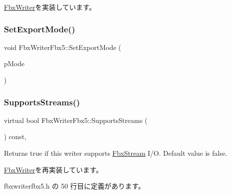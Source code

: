\hyperlink{class_fbx_writer_a0fd62ec785e7108924975591ee8fbf30}{Fbx\+Writer}を実装しています。

\mbox{\label{class_fbx_writer_fbx5_acc9f4ffbe4f27954c534a53b4a0ccb32}} 
\subsubsection{\texorpdfstring{Set\+Export\+Mode()}{SetExportMode()}}
{\footnotesize\ttfamily void Fbx\+Writer\+Fbx5\+::\+Set\+Export\+Mode (\begin{DoxyParamCaption}\item[{\hyperlink{class_fbx_writer_fbx5_a0424a2f24c66021ce1bfe4477eb4209e}{E\+Export\+Mode}}]{p\+Mode }\end{DoxyParamCaption})}

\mbox{\label{class_fbx_writer_fbx5_a6e6683ad630d545bd0251f7bf8e114d9}} 
\subsubsection{\texorpdfstring{Supports\+Streams()}{SupportsStreams()}}
{\footnotesize\ttfamily virtual bool Fbx\+Writer\+Fbx5\+::\+Supports\+Streams (\begin{DoxyParamCaption}{ }\end{DoxyParamCaption}) const\hspace{0.3cm}{\ttfamily [inline]}, {\ttfamily [virtual]}}

Returns true if this writer supports \hyperlink{class_fbx_stream}{Fbx\+Stream} I/O. Default value is false. 

\hyperlink{class_fbx_writer_aa79a285227d113ee6d64aee6a84986cd}{Fbx\+Writer}を再実装しています。



 fbxwriterfbx5.\+h の 50 行目に定義があります。

\mbox{\label{class_fbx_writer_fbx5_a50a64e5e28a3ae1a89aa7107b80b7d26}} 
